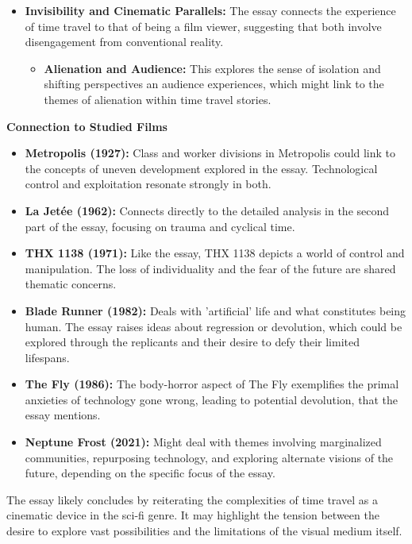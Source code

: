 \documentclass[11pt,fleqn]{book} %
\begin{document}
\begin{itemize}
\item \textbf{Invisibility and Cinematic Parallels:} The essay connects the experience of time travel to that of being a film viewer, suggesting that both involve disengagement from conventional reality.
    \begin{itemize}
        \item \textbf{Alienation and Audience:} This explores the sense of isolation and shifting perspectives an audience experiences, which might link to the themes of alienation within time travel stories.
    \end{itemize}

\end{itemize}

\vspace{5pt}
\textbf{Connection to Studied Films}

\begin{itemize}
\item \textbf{Metropolis (1927):}  Class and worker divisions in Metropolis could link to the concepts of uneven development explored in the essay. Technological control and exploitation resonate strongly in both.

\item \textbf{La Jetée (1962):} Connects directly to the detailed analysis in the second part of the essay, focusing on trauma and cyclical time.

\item \textbf{THX 1138 (1971):}  Like the essay, THX 1138 depicts a world of control and manipulation. The loss of individuality and the fear of the future are shared thematic concerns. 

\item \textbf{Blade Runner (1982):} Deals with 'artificial' life and what constitutes being human. The essay raises ideas about regression or devolution, which could be explored through the replicants and their desire to defy their limited lifespans.

\item \textbf{The Fly (1986):}  The body-horror aspect of The Fly exemplifies the primal anxieties of technology gone wrong, leading to potential devolution, that the essay mentions.

\item \textbf{Neptune Frost (2021):} Might deal with themes involving marginalized communities, repurposing technology, and exploring alternate visions of the future, depending on the specific focus of the essay.

\end{itemize}
\vspace{5pt}
The essay likely concludes by reiterating the complexities of time travel as a cinematic device in the sci-fi genre. It may highlight the tension between the desire to explore vast possibilities and the limitations of the visual medium itself.
\end{document}

